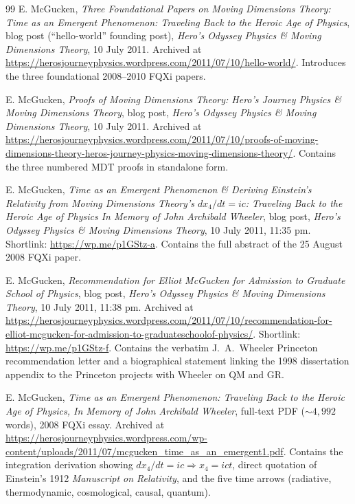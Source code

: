 \documentclass[11pt,a4paper]{article}
\begin{document}
\begin{thebibliography}{99}
 E. McGucken, \emph{Three Foundational Papers on Moving Dimensions Theory: Time as an Emergent Phenomenon: Traveling Back to the Heroic Age of Physics}, blog post (``hello-world'' founding post), \emph{Hero's Odyssey Physics \& Moving Dimensions Theory}, 10 July 2011. Archived at \url{https://herosjourneyphysics.wordpress.com/2011/07/10/hello-world/}. Introduces the three foundational 2008--2010 FQXi papers.

 E. McGucken, \emph{Proofs of Moving Dimensions Theory: Hero's Journey Physics \& Moving Dimensions Theory}, blog post, \emph{Hero's Odyssey Physics \& Moving Dimensions Theory}, 10 July 2011. Archived at \url{https://herosjourneyphysics.wordpress.com/2011/07/10/proofs-of-moving-dimensions-theory-heros-journey-physics-moving-dimensions-theory/}. Contains the three numbered MDT proofs in standalone form.

 E. McGucken, \emph{Time as an Emergent Phenomenon \& Deriving Einstein's Relativity from Moving Dimensions Theory's $dx_4/dt=ic$: Traveling Back to the Heroic Age of Physics In Memory of John Archibald Wheeler}, blog post, \emph{Hero's Odyssey Physics \& Moving Dimensions Theory}, 10 July 2011, 11:35 pm. Shortlink: \url{https://wp.me/p1GStz-a}. Contains the full abstract of the 25 August 2008 FQXi paper.

 E. McGucken, \emph{Recommendation for Elliot McGucken for Admission to Graduate School of Physics}, blog post, \emph{Hero's Odyssey Physics \& Moving Dimensions Theory}, 10 July 2011, 11:38 pm. Archived at \url{https://herosjourneyphysics.wordpress.com/2011/07/10/recommendation-for-elliot-mcgucken-for-admission-to-graduateschoolof-physics/}. Shortlink: \url{https://wp.me/p1GStz-f}. Contains the verbatim J.\ A.\ Wheeler Princeton recommendation letter and a biographical statement linking the 1998 dissertation appendix to the Princeton projects with Wheeler on QM and GR.

 E. McGucken, \emph{Time as an Emergent Phenomenon: Traveling Back to the Heroic Age of Physics, In Memory of John Archibald Wheeler}, full-text PDF (${\sim}4{,}992$ words), 2008 FQXi essay. Archived at \url{https://herosjourneyphysics.wordpress.com/wp-content/uploads/2011/07/mcgucken_time_as_an_emergent1.pdf}. Contains the integration derivation showing $dx_4/dt = ic \Rightarrow x_4 = ict$, direct quotation of Einstein's 1912 \emph{Manuscript on Relativity}, and the five time arrows (radiative, thermodynamic, cosmological, causal, quantum).


\end{thebibliography}
\end{document}
